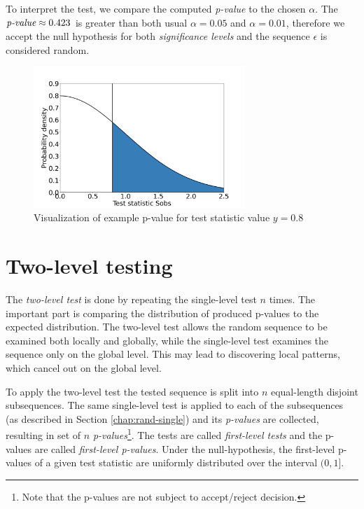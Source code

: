 \documentclass[
  digital,     %
  oneside,     %
  nosansbold,  %
  nocolorbold, %
  nolof,         %
  nolot,         %
]{fithesis4}
\begin{document}
To interpret the test, we compare the computed \emph{p-value} to the chosen $\alpha$. The $\emph{p-value} \approx 0.423$ is greater than both usual $\alpha = 0.05$ and $\alpha = 0.01$, therefore we accept the null hypothesis for both \emph{significance levels} and the sequence $\epsilon$ is considered random.

\begin{figure}
  \begin{center}
    \includegraphics[width=8cm]{figures/test_example.png}
  \end{center}
  \caption{Visualization of example p-value for test statistic value $y = 0.8$}
  \label{fig:example}
\end{figure}

\section{Two-level testing} \label{chap:rand-two_level}

The \emph{two-level test} is done by repeating the single-level test $n$ times. The important part is comparing the distribution of produced p-values to the expected distribution. The two-level test allows the random sequence to be examined both locally and globally, while the single-level test examines the sequence only on the global level. This may lead to discovering local patterns, which cancel out on the global level. \cite[p. 7]{tu01_paper}

To apply the two-level test the tested sequence is split into $n$ equal-length disjoint subsequences. The same single-level test is applied to each of the subsequences (as described in Section \ref{chap:rand-single}) and its \emph{p-values} are collected, resulting in set of $n$ \emph{p-values}\footnote{Note that the p-values are not subject to accept/reject decision.}. The tests are called \emph{first-level tests} and the p-values are called \emph{first-level p-values}. Under the null-hypothesis, the first-level p-values of a given test statistic are uniformly distributed over the interval $(0,1]$. \cite[p. 14]{bad_day} 
\end{document}
